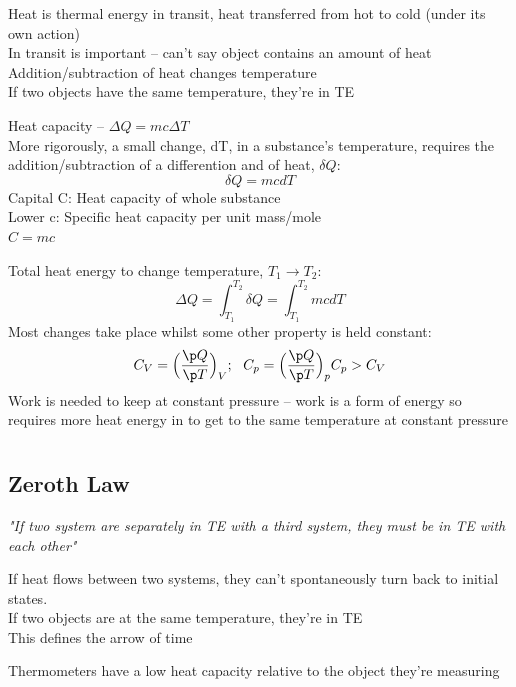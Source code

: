 \documentclass[a4paper, 11pt, normalem]{report}
\begin{document}
Heat is thermal energy in transit, heat transferred from hot to cold (under its own action) \\
In transit is important -- can't say object contains an amount of heat \\
Addition/subtraction of heat changes temperature \\
If two objects have the same temperature, they're in TE

Heat capacity -- $\Delta Q = mc\Delta T$ \\
More rigorously, a small change, dT, in a substance's temperature, requires the addition/subtraction of a differention and of heat,  $\delta Q$:
\begin{equation*}
    \delta Q = mcdT
\end{equation*}
Capital C: Heat capacity of whole substance \\
Lower c: Specific heat capacity per unit mass/mole \\
$C = mc$

Total heat energy to change temperature, $T_1 \to T_2$:
\begin{equation*}
    \Delta Q = \int_{T_{1}}^{T_{2}} \delta Q = \int_{T_1}^{T_2} mcdT
\end{equation*}
Most changes take place whilst some other property is held constant:
\begin{gather*}
    C_{V} = \Big(\frac{\p Q}{\p T}\Big)_{V};~~ C_{p} = \Big(\frac{\p Q}{\p T}\Big)_{p}
    C_{p} > C_{V}
\end{gather*}
Work is needed to keep at constant pressure -- work is a form of energy so requires more heat energy in to get to the same temperature at constant pressure

\chapter{}
\section{Zeroth Law}
\emph{"If two system are separately in TE with a third system, they must be in TE with each other"}

If heat flows between two systems, they can't spontaneously turn back to initial states. \\
If two objects are at the same temperature, they're in TE \\
This defines the arrow of time

Thermometers have a low heat capacity relative to the object they're measuring
\end{document}
